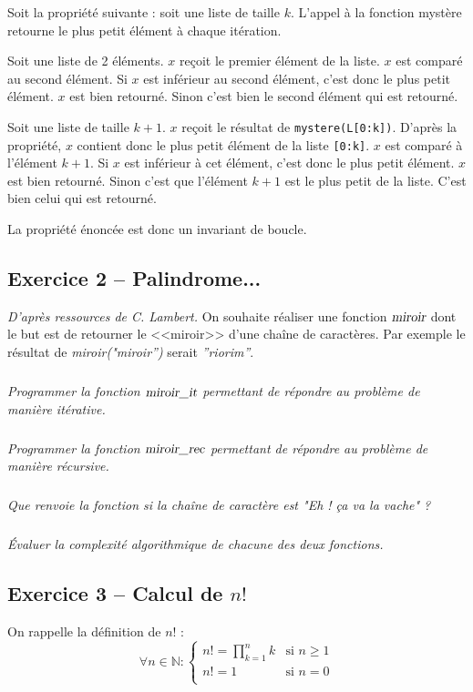 \documentclass[10pt,fleqn]{article} %
\begin{document}
\begin{multicols}{2}
\begin{corrige}
\vspace{.25cm}

Soit la propriété suivante : soit une liste de taille $k$. L'appel à la fonction mystère retourne le plus petit élément à chaque itération. 

Soit une liste de 2 éléments. $x$ reçoit le premier élément de la liste. $x$ est comparé au second élément. Si $x$ est inférieur au second élément, c'est donc le plus petit élément. $x$ est bien retourné. Sinon c'est bien le second élément qui est retourné. 


Soit une liste de taille $k+1$.  $x$ reçoit le résultat de \texttt{mystere(L[0:k])}. D'après la propriété, $x$ contient donc le plus petit élément de la liste \texttt{[0:k]}. $x$ est comparé à l'élément $k+1$. Si $x$ est inférieur à cet élément, c'est donc le plus petit élément. $x$ est bien retourné. Sinon c'est que l'élément $k+1$ est le plus petit de la liste. C'est bien celui qui est retourné. 

La propriété énoncée est donc un invariant de boucle.
\end{corrige}
\else
\fi

\subsection*{Exercice 2 -- Palindrome...}
\textit{D'après ressources de C. Lambert.}
\setcounter{exo}{0}
On souhaite réaliser une fonction $\textsl{miroir}$ dont le but est de retourner le <<miroir>> d'une chaîne de caractères. Par exemple le résultat de \textsl{miroir("miroir'')} serait \textsl{''riorim''}.

\subparagraph{}
\textit{Programmer la fonction $\textsl{miroir\_it}$ permettant de répondre au problème de manière itérative.}


\subparagraph{}
\textit{Programmer la fonction $\textsl{miroir\_rec}$ permettant de répondre au problème de manière récursive.}


\subparagraph{}
\textit{Que renvoie la fonction si la chaîne de caractère est "Eh ! ça va la vache" ?}
 
 \subparagraph{}
\textit{Évaluer la complexité algorithmique de chacune des deux fonctions.}

 
\subsection*{Exercice 3 -- Calcul de $n!$}
\setcounter{exo}{0}

\noindent 
On rappelle la définition de $n!$ :
$$
\forall n\in \mathbb{N} : \left\{ \begin{array}{ll}
n!= \prod_{k=1}^n k & \text{si } n\geq1 \\
n!= 1 & \text{si } n=0 \\
\end{array} \right.
$$


\end{multicols}
\end{document}
